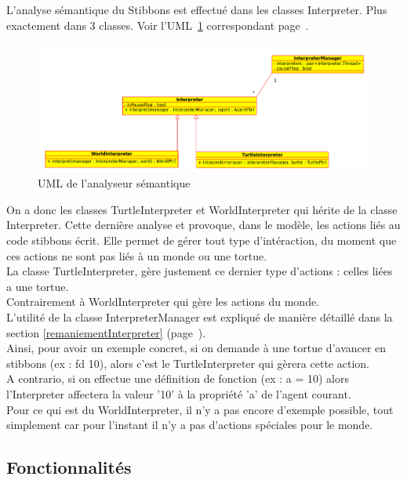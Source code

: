 L'analyse sémantique du Stibbons est effectué dans les classes Interpreter. Plus exactement dans 3 classes. Voir l'UML~\ref{interpreterUML} correspondant page~\pageref{interpreterUML}.\\
\begin{figure}[h]
\caption{\label{interpreterUML} UML de l'analyseur sémantique}
\includegraphics[scale=0.5]{doc/report/uml/interpreterUML.png}
\end{figure}

On a donc les classes TurtleInterpreter et WorldInterpreter qui hérite de la classe Interpreter. Cette dernière analyse et provoque, dans le modèle, les actions liés au code stibbons écrit. Elle permet de gérer tout type d'intéraction, du moment que ces actions ne sont pas liés à un monde ou une tortue.\\
La classe TurtleInterpreter, gère justement ce dernier type d'actions : celles liées a une tortue.\\
Contrairement à WorldInterpreter qui gère les actions du monde.\\

L'utilité de la classe InterpreterManager est expliqué de manière détaillé dans la section \ref{remaniementInterpreter} (page~\pageref{remaniementInterpreter}).\\

Ainsi, pour avoir un exemple concret, si on demande à une tortue d'avancer en stibbons (ex : fd 10), alors c'est le TurtleInterpreter qui gèrera cette action.\\
A contrario, si on effectue une définition de fonction (ex : a = 10) alors l'Interpreter affectera la valeur '10' à la propriété 'a' de l'agent courant.\\
Pour ce qui est du WorldInterpreter, il n'y a pas encore d'exemple possible, tout simplement car pour l'instant il n'y a pas d'actions spéciales pour le monde.

\subsection{Fonctionnalités}

